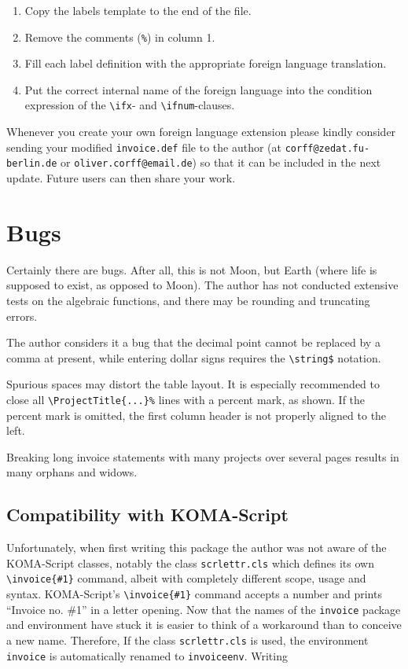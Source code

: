 \documentclass[11pt]{ltxdoc}
\begin{document}
\begin{enumerate}
	\item Copy the labels template to the end of the file.
	\item Remove the comments (\verb-%-) in column 1.
	\item Fill each label definition with the appropriate
		foreign language translation.
	\item Put the correct internal name of the foreign language
		into the condition expression of the \verb-\ifx--
		and \verb-\ifnum--clauses.
\end{enumerate}

\begin{sloppypar}
Whenever you create your own foreign language extension please kindly
consider sending your modified \verb-invoice.def- file to the author
(at \verb+corff@zedat.fu-berlin.de+ or \verb+oliver.corff@email.de+)
so that it can be included in the next update. Future users can then
share your work.
\end{sloppypar}

\section{Bugs}

Certainly there are bugs. After all, this is not Moon, but Earth
(where life is supposed to exist, as opposed to Moon). The author 
has not conducted extensive tests on the algebraic functions, and
there may be rounding and truncating errors.

The author considers it a bug that the decimal point cannot be
replaced by a comma at present, while entering dollar signs
requires the \verb|\string$| notation.

Spurious spaces may distort the table layout. It is especially
recommended to close all \verb"\ProjectTitle{...}%" lines with a
percent mark, as shown. If the percent mark is omitted, the first
column header is not properly aligned to the left.

Breaking long invoice statements with many projects over several
pages results in many orphans and widows.

\subsection{\label{koma}Compatibility with KOMA-Script}

Unfortunately, when first writing this package the author was not aware
of the KOMA-Script classes, notably the class \texttt{scrlettr.cls}
which defines its own \verb-\invoice{#1}- command, albeit with completely
different scope, usage and syntax. KOMA-Script's \verb-\invoice{#1}- command
accepts a number and prints ``Invoice no. \#1'' in a letter 
opening. Now that the names of the \texttt{invoice} package and
environment have stuck it is easier to think of a workaround than to
conceive a new name. Therefore, If the class \texttt{scrlettr.cls} is
used, the environment \texttt{invoice} is automatically renamed to
\texttt{invoiceenv}. Writing 
\end{document}
